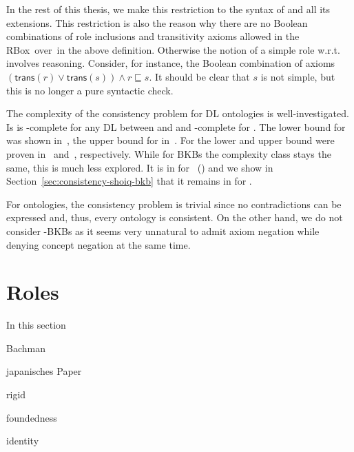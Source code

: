 In the rest of this thesis, we make this restriction to the syntax of \SHQ and all its
extensions.
%
This restriction is also the reason why there are no Boolean combinations of
role inclusions and transitivity axioms allowed in the RBox~\Rmc over~\Nsig in
the above definition.  Otherwise the notion of a simple role w.r.t.~\Rmc
involves reasoning.  Consider, for instance, the Boolean combination of axioms
$(\mathsf{trans}(r)\lor\mathsf{trans}(s))\land r\sqsubseteq s$.  It should be
clear that $s$ is not simple, but this is no longer a pure syntactic check.

The complexity of the consistency problem for DL ontologies is well-investigated. Is is
\ExpTime-complete for any DL between \ALC and \SHOQ and \NExpTime-complete for \SHOIQ. The lower
bound for \ALC was shown in~\cite{Sch-IJCAI91}, the upper bound for \SHOQ in~\cite{Tob-PhD01}. For
\SHOIQ the lower and upper bound were proven in~\cite{Tob-JAIR00} and~\cite{Tob-PhD01},
respectively. While for BKBs the complexity class stays the same, this is much less explored. It is
in \ExpTime for \SHOQ~(\cite{Lip-PhD14}) and we show in Section~\ref{sec:consistency-shoiq-bkb} that
it remains in \NExpTime for \SHOIQ.

For \EL ontologies, the consistency problem is trivial since no contradictions can be expressed and, thus,
every \EL ontology is consistent. On the other hand, we do not consider \EL-BKBs as it seems very unnatural to
admit axiom negation while denying concept negation at the same time.


\section{Roles}
\label{sec:rosiroles}

In this section 

Bachman

japanisches Paper

rigid

foundedness

identity





